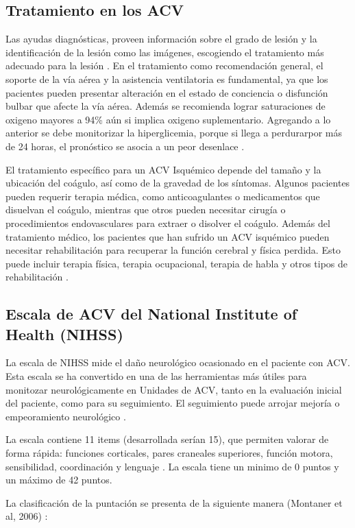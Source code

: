 \subsection{Tratamiento en los ACV}
Las ayudas diagnósticas, proveen información sobre el grado de lesión y la identificación de la lesión  como las imágenes, escogiendo el tratamiento más adecuado para la lesión \cite{Wintermark2013}. En el tratamiento como recomendación general, el soporte de la vía aérea y la asistencia ventilatoria es fundamental, ya que los pacientes pueden presentar alteración en el estado de conciencia o disfunción bulbar que afecte la vía aérea. Además se recomienda lograr saturaciones de oxigeno mayores a 94\% aún si implica oxigeno suplementario. Agregando a lo anterior se debe monitorizar la hiperglicemia, porque si llega a perdurarpor más de 24 horas, el pronóstico se asocia a un peor desenlace \cite{Garcia2019}.\\
\par El tratamiento específico para un ACV Isquémico depende del tamaño y la ubicación del coágulo, así como de la gravedad de los síntomas. Algunos pacientes pueden requerir terapia médica, como anticoagulantes o medicamentos que disuelvan el coágulo, mientras que otros pueden necesitar cirugía o procedimientos endovasculares para extraer o disolver el coágulo. Además del tratamiento médico, los pacientes que han sufrido un ACV isquémico pueden necesitar rehabilitación para recuperar la función cerebral y física perdida. Esto puede incluir terapia física, terapia ocupacional, terapia de habla y otros tipos de rehabilitación \cite{Garcia2019}.\\


\doublespacing
\subsection{Escala de ACV del National Institute of Health (NIHSS)} 
\label{sec:NIHSS}
La escala de NIHSS mide el daño neurológico ocasionado en el paciente con ACV. Esta escala se ha convertido en una de las herramientas más útiles para monitozar neurológicamente en Unidades de ACV, tanto en la evaluación inicial del paciente, como para su seguimiento. El seguimiento puede arrojar mejoría o empeoramiento neurológico \cite{cien2001}. \\
\par La escala contiene 11 items (desarrollada serían 15), que permiten valorar de forma rápida: funciones corticales, pares craneales superiores, función motora, sensibilidad, coordinación y lenguaje \cite{cien2001}. La escala tiene un minimo de 0 puntos y un máximo de 42 puntos.\\
\par La clasificación de la puntación se presenta de la siguiente manera (Montaner et al, 2006) \cite{montaner2006escala}:


